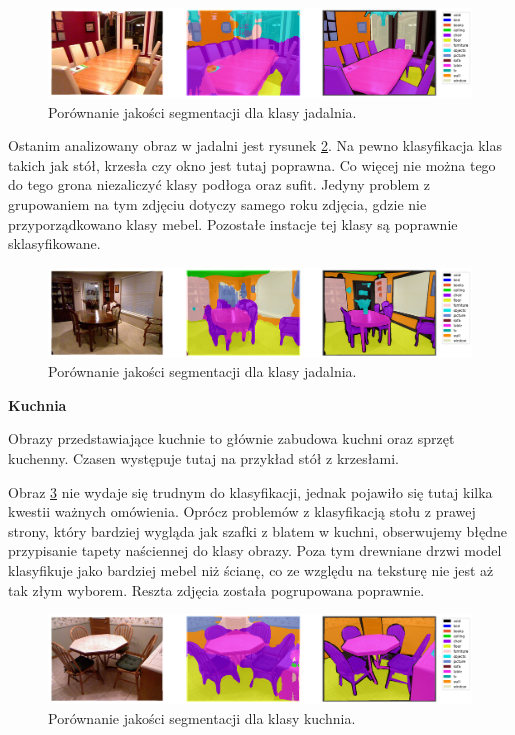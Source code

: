 \begin{figure}[ht!]
    \centering
    \includegraphics[width=\textwidth]{img/preds_analysis/gt_vs_pred/dining_room-2.png}
    \caption{Porównanie jakości segmentacji dla klasy jadalnia.}
    \label{fig:dining_room-pred-2}
\end{figure}

Ostanim analizowany obraz w jadalni jest rysunek \ref{fig:dining_room-pred-3}. Na pewno klasyfikacja klas takich jak stół, krzesła czy okno jest tutaj poprawna. Co więcej nie można tego do tego grona niezaliczyć klasy podłoga oraz sufit. Jedyny problem z grupowaniem na tym zdjęciu dotyczy samego roku zdjęcia, gdzie nie przyporządkowano klasy mebel. Pozostałe instacje tej klasy są poprawnie sklasyfikowane.

\begin{figure}[ht!]
    \centering
    \includegraphics[width=\textwidth]{img/preds_analysis/gt_vs_pred/dining_room-3.png}
    \caption{Porównanie jakości segmentacji dla klasy jadalnia.}
    \label{fig:dining_room-pred-3}
\end{figure}

\noindent
\textbf{Kuchnia}

Obrazy przedstawiające kuchnie to głównie zabudowa kuchni oraz sprzęt kuchenny. Czasen występuje tutaj na przykład stół z krzesłami.

Obraz \ref{fig:kitchen-pred-1} nie wydaje się trudnym do klasyfikacji, jednak pojawiło się tutaj kilka kwestii ważnych omówienia. Oprócz problemów z klasyfikacją stołu z prawej strony, który bardziej wygląda jak szafki z blatem w kuchni, obserwujemy błędne przypisanie tapety naściennej do klasy obrazy. Poza tym drewniane drzwi model klasyfikuje jako bardziej mebel niż ścianę, co ze względu na teksturę nie jest aż tak złym wyborem. Reszta zdjęcia została pogrupowana poprawnie.

\begin{figure}[ht!]
    \centering
    \includegraphics[width=\textwidth]{img/preds_analysis/gt_vs_pred/kitchen-1.png}
    \caption{Porównanie jakości segmentacji dla klasy kuchnia.}
    \label{fig:kitchen-pred-1}
\end{figure}

